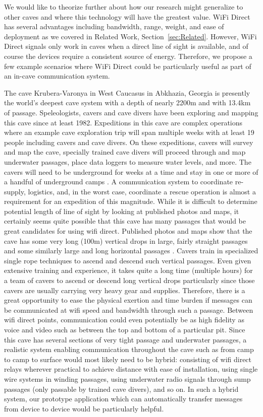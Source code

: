 \documentclass[10pt,twocolumn]{article}
\begin{document}
We would like to theorize further about how our research might generalize to other caves and where this technology will have the greatest value.
WiFi Direct has several advantages including bandwidth, range, weight, and ease of deployment as we covered in Related Work, Section~\ref{sec:Related}.
However, WiFi Direct signals only work in caves when a direct line of sight is available, 
and of course the devices require a consistent source of energy.
Therefore, we propose a few example scenarios where WiFi Direct could be particularly useful as part of an in-cave communication system.

The cave Krubera-Varonya in West Caucasus in Abkhazia, Georgia is presently the world's deepest cave system with a depth of nearly 2200m and with 13.4km of passage. 
Speleologists, cavers and cave divers have been exploring and mapping this cave since at least 1982.
Expeditions in this cave are complex operations where an example cave exploration trip will span multiple weeks with at least 19 people including cavers and cave divers.
On these expeditions, cavers will survey and map the cave, specially trained cave divers will proceed through and map underwater passages, place data loggers to measure water levels, and more.
The cavers will need to be underground for weeks at a time and stay in one or more of a handful of underground camps \cite{krub_it}.
A communication system to coordinate re-supply, logistics, and, in the worst case, coordinate a rescue operation is almost a requirement for an expedition of this magnitude.
While it is difficult to determine potential length of line of sight by looking at published photos and maps, 
it certainly seems quite possible that this cave has many passages that would be great candidates for using wifi direct.
Published photos and maps show that the cave has some very long (100m) vertical drops in large, fairly straight passages and some similarly large and long horizontal passages \cite{krub_it}.
Cavers train in specialized single rope techniques to ascend and descend such vertical passages.
Even given extensive training and experience, it takes quite a long time (multiple hours) for a team of cavers to ascend or descend long vertical drops particularly since those cavers are usually carrying very heavy gear and supplies.
Therefore, there is a great opportunity to ease the physical exertion and time burden if messages can be communicated at wifi speed and bandwidth through such a passage.
Between wifi direct points, communication could even potentially be as high fidelity as voice and video such as between the top and bottom of a particular pit.
Since this cave has several sections of very tight passage and underwater passages,
a realistic system enabling communication throughout the cave such as from camp to camp to surface would most likely need to be hybrid:
consisting of wifi direct relays wherever practical to achieve distance with ease of installation, using single wire systems in winding passages, using underwater radio signals through sump passages (only passable by trained cave divers), and so on.
In such a hybrid system, our prototype application which can automatically transfer messages from device to device would be particularly helpful.
\end{document}
